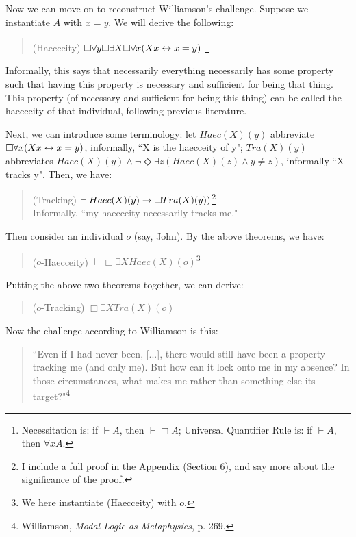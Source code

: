 Now we can move on to reconstruct Williamson's challenge. Suppose we instantiate $A$ with $x=y$. We will derive the following:
\begin{quote}
(Haecceity) \hspace{\labelsep} $\Box \forall y \Box \exists X \Box \forall x (Xx \leftrightarrow x=y)$ \footnote{Necessitation is: if $\vdash A$, then $\vdash \Box A$; Universal Quantifier Rule is: if $\vdash A$, then $\forall x A$. }
\end{quote}
Informally, this says that necessarily everything necessarily has some property such that having this property is necessary and sufficient for being that thing. This property (of necessary and sufficient for being this thing) can be called the haecceity of that individual, following previous literature. 

Next, we can introduce some terminology: let $Haec(X)(y)$ abbreviate $\Box \forall x (Xx \leftrightarrow x=y)$, informally, ``X is the haecceity of y"; $Tra(X)(y)$ abbreviates $Haec(X)(y) \wedge \neg \Diamond \exists z (Haec(X)(z) \wedge y \neq z)$, informally ``X tracks y". Then, we have: 
\begin{quote}
(Tracking)  \hspace{\labelsep} $\vdash Haec(X)(y) \rightarrow \Box Tra(X)(y))$\footnote{I include a full proof in the Appendix (Section 6), and say more about the significance of the proof.} \smallskip \\
Informally, ``my haecceity necessarily tracks me."
\end{quote}
Then consider an individual $o$ (say, John). By the above theorems, we have: 
\begin{quote}
($o$-Haecceity) \hspace{\labelsep} $\vdash \Box \exists X Haec(X)(o)$\footnote{We here instantiate (Haecceity) with $o$.}
\end{quote}
Putting the above two theorems together, we can derive: 
\begin{quote}
($o$-Tracking)  \hspace{\labelsep} $\Box \exists X Tra(X)(o)$
\end{quote}
Now the challenge according to Williamson is this: 
\begin{quote}
``Even if I had never been, [...], there would still have been a property tracking me (and only me). But how can it lock onto me in my absence? In those circumstances, what makes me rather than something else its target?"\footnote{Williamson, \textit{Modal Logic as Metaphysics}, p. 269.}
\end{quote}
